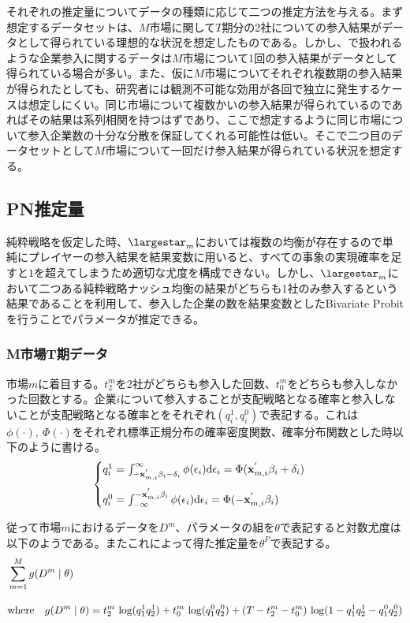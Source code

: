 \documentclass{jsarticle}
\begin{document}
それぞれの推定量についてデータの種類に応じて二つの推定方法を与える。まず想定するデータセットは、$M$市場に関して$T$期分の2社についての参入結果がデータとして得られている理想的な状況を想定したものである。しかし、\cite{Ciliberto2009a}で扱われるような企業参入に関するデータは$M$市場について1回の参入結果がデータとして得られている場合が多い。また、仮に$M$市場についてそれぞれ複数期の参入結果が得られたとしても、研究者には観測不可能な効用が各回で独立に発生するケースは想定しにくい。同じ市場について複数かいの参入結果が得られているのであればその結果は系列相関を持つはずであり、ここで想定するように同じ市場について参入企業数の十分な分散を保証してくれる可能性は低い。そこで二つ目のデータセットとして$M$市場について一回だけ参入結果が得られている状況を想定する。

\subsection{PN推定量}
純粋戦略を仮定した時、$\largestar_m$においては複数の均衡が存在するので単純にプレイヤーの参入結果を結果変数に用いると、すべての事象の実現確率を足すと$1$を超えてしまうため適切な尤度を構成できない。しかし、$\largestar_m$において二つある純粋戦略ナッシュ均衡の結果がどちらも1社のみ参入するという結果であることを利用して、参入した企業の数を結果変数としたBivariate Probitを行うことでパラメータが推定できる。

\subsubsection{M市場T期データ}
市場$m$に着目する。$t_2^m$を2社がどちらも参入した回数、$t_0^m$をどちらも参入しなかった回数とする。企業$i$について参入することが支配戦略となる確率と参入しないことが支配戦略となる確率とをそれぞれ$(q_i^1, q_i^0)$で表記する。これは$\phi(\cdot),\ \Phi(\cdot)$をそれぞれ標準正規分布の確率密度関数、確率分布関数とした時以下のように書ける。
\begin{align*}
\begin{cases}
	q_i^1 = \int_{-{\bf x}_{m, i}^{'} \beta_i - \delta_i}^{\infty} \phi(\epsilon_i) \mathrm{d}\epsilon_i = \Phi({\bf x}_{m, i}^{'} \beta_i + \delta_i)\\[10pt]
	q_i^0 = \int_{-\infty}^{-{\bf x}_{m, i}^{'} \beta_i} \phi(\epsilon_i) \mathrm{d}\epsilon_i = \Phi(-{\bf x}_{m, i}^{'} \beta_i)
\end{cases}
\end{align*}

従って市場$m$におけるデータを$D^m$、パラメータの組を$\theta$で表記すると対数尤度は以下のようである。またこれによって得た推定量を$\theta^P$で表記する。
\begin{align*}
	&\sum_{m = 1}^M g(D^m \mid \theta)\\[10pt]
	&\text{where}\quad g(D^m \mid \theta) = t_2^m\ {\rm log} (q_1^1 q_2^1) + t_0^m\ {\rm log} (q_1^0 q_2^0) + (T - t_2^m - t_0^m)\ {\rm log} (1- q_1^1 q_2^1 - q_1^0 q_2^0)
\end{align*}
\end{document}
